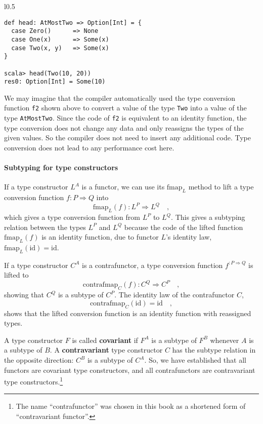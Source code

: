 \begin{wrapfigure}{l}{0.5\columnwidth}%
\vspace{-0.5\baselineskip}
\begin{lstlisting}
def head: AtMostTwo => Option[Int] = {
  case Zero()      => None
  case One(x)      => Some(x)
  case Two(x, y)   => Some(x)
}

scala> head(Two(10, 20))
res0: Option[Int] = Some(10)
\end{lstlisting}

\vspace{-1\baselineskip}
\end{wrapfigure}%
We may imagine that the compiler automatically used the type conversion
function \lstinline!f2! shown above to convert a value of the type
\lstinline!Two! into a value of the type \lstinline!AtMostTwo!.
Since the code of \lstinline!f2! is equivalent to an identity function,
the type conversion does not change any data and only reassigns the
types of the given values. So the compiler does not need to insert
any additional code. Type conversion does not lead to any performance
cost here.

\paragraph{Subtyping for type constructors}

If a type constructor $L^{A}$ is a functor, we can use its $\text{fmap}_{L}$
method to lift a type conversion function $f:P\Rightarrow Q$ into
\[
\text{fmap}_{L}(f):L^{P}\Rightarrow L^{Q}\quad,
\]
which gives a type conversion function from $L^{P}$ to $L^{Q}$.
This gives a subtyping relation between the types $L^{P}$ and $L^{Q}$
because the code of the lifted function $\text{fmap}_{L}(f)$ is an
identity function, due to functor $L$'s identity law, $\text{fmap}_{L}(\text{id})=\text{id}$. 

If a type constructor $C^{A}$ is a contrafunctor, a type conversion
function $f^{:P\Rightarrow Q}$ is lifted to 
\[
\text{contrafmap}_{C}(f):C^{Q}\Rightarrow C^{P}\quad,
\]
showing that $C^{Q}$ is a subtype of $C^{P}$. The identity law of
the contrafunctor $C$, 
\[
\text{contrafmap}_{C}(\text{id})=\text{id}\quad,
\]
shows that the lifted conversion function is an identity function
with reassigned types.

A type constructor $F$ is called \textbf{covariant}
if $F^{A}$ is a subtype of $F^{B}$ whenever $A$ is a subtype of
$B$. A \textbf{contravariant}
type constructor $C$ has the subtype relation in the opposite direction:
$C^{B}$ is a subtype of $C^{A}$. So, we have established that all
functors are covariant type constructors, and all contrafunctors are
contravariant type constructors.\footnote{The name ``contrafunctor'' was chosen in this book as a shortened
form of ``contravariant functor''.} 

